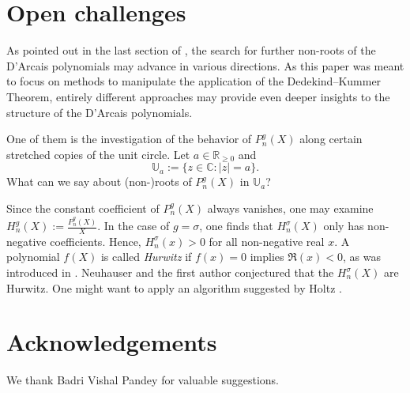 \documentclass[a4paper, 11pt, reqno]{amsart}
\theoremstyle{plain}
\theoremstyle{definition}
\theoremstyle{remark}
\numberwithin{equation}{section}
\newcommand{\C}{\mathbb{C}}
\newcommand{\R}{\mathbb{R}}
\begin{document}
\section{Open challenges}

As pointed out in the last section of \cite{HeimNeu25}, the search for further non-roots of the D'Arcais polynomials may advance in various directions. As this paper was meant to focus on methods to manipulate the application of the Dedekind--Kummer Theorem, entirely different approaches may provide even deeper insights to the structure of the D'Arcais polynomials.

One of them is the investigation of the behavior of $P_n^g(X)$ along certain stretched copies of the unit circle. Let $a \in \R_{\geq 0}$ and
\[\mathbb{U}_a := \{z \in \C : |z| = a\}.\]
What can we say about (non-)roots of $P_n^g(X)$ in $\mathbb{U}_a$?

Since the constant coefficient of $P_n^g(X)$ always vanishes, one may examine $H_n^g(X) := \frac{P_n^g(X)}{X}$. In the case of $g = \sigma$, one finds that $H_n^\sigma(X)$ only has non-negative coefficients. Hence, $H_n^\sigma(x) > 0$ for all non-negative real $x$. A polynomial $f(X)$ is called \emph{Hurwitz} if $f(x) = 0$ implies $\Re (x) < 0$, as was introduced in \cite{Hurw}. Neuhauser and the first author conjectured that the $H_n^\sigma(X)$ are Hurwitz. One might want to apply an algorithm suggested by Holtz \cite{Holtz}.

\section*{Acknowledgements}

We thank Badri Vishal Pandey for valuable suggestions.
\end{document}
